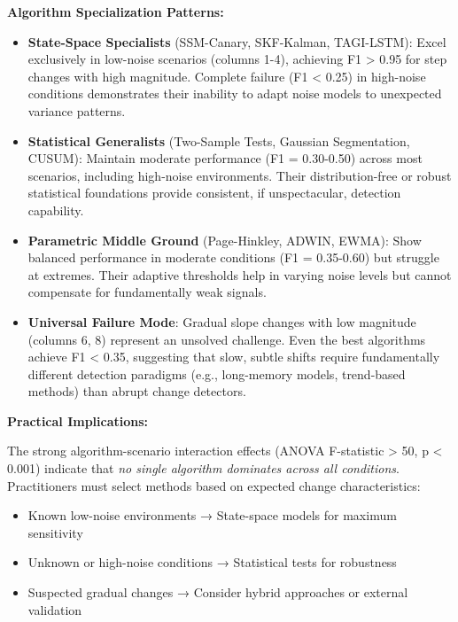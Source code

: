 \textbf{Algorithm Specialization Patterns:}

\begin{itemize}
    \item \textbf{State-Space Specialists} (SSM-Canary, SKF-Kalman, TAGI-LSTM): Excel exclusively in low-noise scenarios (columns 1-4), achieving F1 > 0.95 for step changes with high magnitude. Complete failure (F1 < 0.25) in high-noise conditions demonstrates their inability to adapt noise models to unexpected variance patterns.
    
    \item \textbf{Statistical Generalists} (Two-Sample Tests, Gaussian Segmentation, CUSUM): Maintain moderate performance (F1 = 0.30-0.50) across most scenarios, including high-noise environments. Their distribution-free or robust statistical foundations provide consistent, if unspectacular, detection capability.
    
    \item \textbf{Parametric Middle Ground} (Page-Hinkley, ADWIN, EWMA): Show balanced performance in moderate conditions (F1 = 0.35-0.60) but struggle at extremes. Their adaptive thresholds help in varying noise levels but cannot compensate for fundamentally weak signals.
    
    \item \textbf{Universal Failure Mode}: Gradual slope changes with low magnitude (columns 6, 8) represent an unsolved challenge. Even the best algorithms achieve F1 < 0.35, suggesting that slow, subtle shifts require fundamentally different detection paradigms (e.g., long-memory models, trend-based methods) than abrupt change detectors.
\end{itemize}

\textbf{Practical Implications:}

The strong algorithm-scenario interaction effects (ANOVA F-statistic > 50, p < 0.001) indicate that \textit{no single algorithm dominates across all conditions}. Practitioners must select methods based on expected change characteristics:
\begin{itemize}
    \item Known low-noise environments → State-space models for maximum sensitivity
    \item Unknown or high-noise conditions → Statistical tests for robustness
    \item Suspected gradual changes → Consider hybrid approaches or external validation
\end{itemize}



